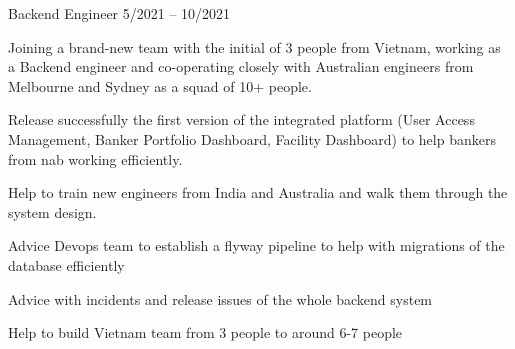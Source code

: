 \begin{cventries}
     \cventry
    {Backend Engineer} %
    {} %
    {} %
    {5/2021 -- 10/2021} %
    {
        \begin{cvitems} %
            \item{Joining a brand-new team with the initial of 3 people from Vietnam, working as a Backend engineer and co-operating closely with Australian engineers from Melbourne and Sydney as a squad of 10+ people.}
            \item {Release successfully the first version of the integrated platform (User Access Management, Banker Portfolio Dashboard, Facility Dashboard) to help bankers from nab working efficiently.}
            \item {Help to train new engineers from India and Australia and walk them through the system design.}
            \item {Advice Devops team to establish a flyway pipeline to help with migrations of the database efficiently}
            \item {Advice with incidents and release issues of the whole backend system}
            \item {Help to build Vietnam team from 3 people to around 6-7 people}
        \end{cvitems}
    }



\end{cventries}
